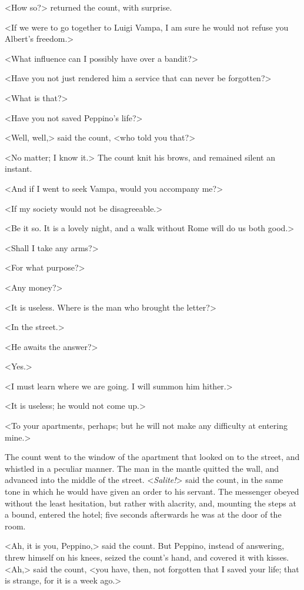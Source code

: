  <How so?> returned the count, with surprise. 

 <If we were to go together to Luigi Vampa, I am sure he would not refuse you Albert's freedom.> 

 <What influence can I possibly have over a bandit?> 

 <Have you not just rendered him a service that can never be forgotten?> 

 <What is that?> 

 <Have you not saved Peppino's life?> 

 <Well, well,> said the count, <who told you that?> 

 <No matter; I know it.> The count knit his brows, and remained silent an instant. 

 <And if I went to seek Vampa, would you accompany me?> 

 <If my society would not be disagreeable.> 

 <Be it so. It is a lovely night, and a walk without Rome will do us both good.> 

 <Shall I take any arms?> 

 <For what purpose?> 

 <Any money?> 

 <It is useless. Where is the man who brought the letter?> 

 <In the street.> 

 <He awaits the answer?> 

 <Yes.> 

 <I must learn where we are going. I will summon him hither.> 

 <It is useless; he would not come up.> 

 <To your apartments, perhaps; but he will not make any difficulty at entering mine.> 

 The count went to the window of the apartment that looked on to the street, and whistled in a peculiar manner. The man in the mantle quitted the wall, and advanced into the middle of the street. <\textit{Salite!}> said the count, in the same tone in which he would have given an order to his servant. The messenger obeyed without the least hesitation, but rather with alacrity, and, mounting the steps at a bound, entered the hotel; five seconds afterwards he was at the door of the room. 

 <Ah, it is you, Peppino,> said the count. But Peppino, instead of answering, threw himself on his knees, seized the count's hand, and covered it with kisses. <Ah,> said the count, <you have, then, not forgotten that I saved your life; that is strange, for it is a week ago.>


